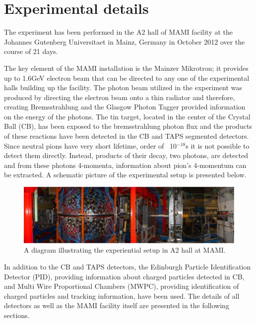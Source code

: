 \setcounter{equation}{0}

\chapter{Experimental details}

\indent The experiment has been performed in the A2 hall of MAMI facility at the Johannes Gutenberg Universitaet in Mainz, Germany in October 2012 over the course of 21 days.

\indent The key element of the MAMI installation is the Mainzer Mikrotron; it provides up to 1.6GeV electron beam that can be directed to any one of the experimental halls building up the facility. The photon beam utilized in the experiment was produced by directing the electron beam onto a thin radiator and therefore, creating Bremsstrahlung and the Glasgow Photon Tagger provided information on the energy of the photons. The tin target, located in the center of the Crystal Ball (CB), has been exposed to the bremsstrahlung photon flux and the products of these reactions have been detected in the CB and TAPS segmented detectors. Since neutral pions have very short lifetime, order of ~10$^{-18}$s it is not possible to detect them directly. Instead, products of their decay, two photons, are detected and from these photons 4-momenta, information about pion's 4-momentum can be extracted. A schematic picture of the experimental setup is presented below.

\begin{figure}[H]
\begin{center}
\includegraphics[scale=0.55]{a2hallsetup.png}
\caption{A diagram illustrating the experiential setup in A2 hall at MAMI.}
\label{a2hallsetup}
\end{center}
\end{figure}

In addition to the CB and TAPS detectors, the Edinburgh Particle Identification Detector (PID), providing information about charged particles detected in CB, and Multi Wire Proportional Chambers (MWPC), providing identification of charged particles and tracking information, have been used. The details of all detectors as well as the MAMI facility itself are presented in the following sections.

